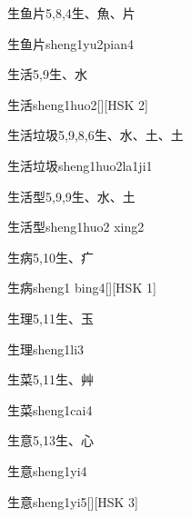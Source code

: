 \begin{entry}{生鱼片}{5,8,4}{⽣、⿂、⽚}
  \begin{phonetics}{生鱼片}{sheng1yu2pian4}
  \end{phonetics}
\end{entry}

\begin{entry}{生活}{5,9}{⽣、⽔}
  \begin{phonetics}{生活}{sheng1huo2}[][HSK 2]
  \end{phonetics}
\end{entry}

\begin{entry}{生活垃圾}{5,9,8,6}{⽣、⽔、⼟、⼟}
  \begin{phonetics}{生活垃圾}{sheng1huo2la1ji1}
  \end{phonetics}
\end{entry}

\begin{entry}{生活型}{5,9,9}{⽣、⽔、⼟}
  \begin{phonetics}{生活型}{sheng1huo2 xing2}
  \end{phonetics}
\end{entry}

\begin{entry}{生病}{5,10}{⽣、⽧}
  \begin{phonetics}{生病}{sheng1 bing4}[][HSK 1]
  \end{phonetics}
\end{entry}

\begin{entry}{生理}{5,11}{⽣、⽟}
  \begin{phonetics}{生理}{sheng1li3}
  \end{phonetics}
\end{entry}

\begin{entry}{生菜}{5,11}{⽣、⾋}
  \begin{phonetics}{生菜}{sheng1cai4}
  \end{phonetics}
\end{entry}

\begin{entry}{生意}{5,13}{⽣、⼼}
  \begin{phonetics}{生意}{sheng1yi4}
  \end{phonetics}
  \begin{phonetics}{生意}{sheng1yi5}[][HSK 3]
  \end{phonetics}
\end{entry}


